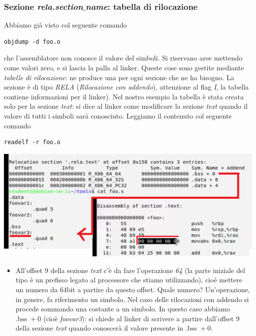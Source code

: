 \documentclass[11pt]{report}
\theoremstyle{definition}
\begin{document}
\subsubsection{Sezione \emph{rela.section$\_$name}: tabella di rilocazione} Abbiamo già visto col seguente comando
\begin{verbatim}
objdump -d foo.o
\end{verbatim}
che l'assemblatore non conosce il valore del simboli. Si riservano aree mettendo come valori zero, e si lascia la palla al linker. Queste cose sono gestite mediante \emph{tabelle di rilocazione}: ne produce una per ogni sezione che ne ha bisogno. La sezione è di tipo \emph{RELA} (\emph{Rilocazione con addendo}), attenzione al flag \emph{I}, la tabella contiene informazioni per il linker). Nel nostro esempio la tabella è stata creata solo per la sezione \emph{text}: si dice al linker come modificare la sezione \emph{text} quando il valore di tutti i simboli sarà conosciuto. Leggiamo il contenuto col seguente comando
\begin{verbatim}
readelf -r foo.o
\end{verbatim}\begin{center}
\includegraphics{img/57.PNG}
\end{center}  
\begin{itemize}
\item All'offset 9 della sezione \emph{text} c'è da fare l'operazione \emph{64} (la parte iniziale del tipo è un prefisso legato al processore che stiamo utilizzando), cioè mettere un numero da 64bit a partire da questo offset. Quale numero? Un'operazione, in genere, fa riferimento un simbolo. Nel caso delle rilocazioni con addendo si procede sommando una costante a un simbolo. In questo caso abbiamo $\text{.bss } + 0$ (cioè \emph{foovar3}): si chiede al linker di scrivere a partire dall'offset 9 della sezione \emph{text} quando conoscerà il valore presente in $\text{.bss } + 0$.
\end{itemize}
\end{document}
